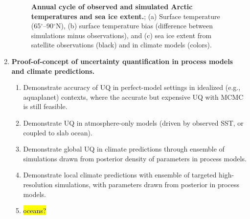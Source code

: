 \documentclass{article}
\begin{document}
\begin{enumerate}
\begin{figure}[htb]
       \caption{\textbf{Annual cycle of observed and simulated Arctic temperatures and sea ice extent.}; (a) Surface temperature (65$^\circ$--90$^\circ$N), (b) surface temperature bias (difference between simulations minus observations), and (c) sea ice extent from satellite observations (black) and in climate models (colors).}\label{f:polar-bias}
    \end{figure}

    
    \item \textbf{Proof-of-concept of uncertainty quantification in process models and climate predictions.}
    \begin{enumerate}
        \item Demonstrate accuracy of UQ in perfect-model settings in idealized (e.g., aquaplanet) contexts, where the accurate but expensive UQ with MCMC is still feasible. 
        \item Demonstrate UQ in atmosphere-only models (driven by observed SST, or coupled to slab ocean).
        \item Demonstrate global UQ in climate predictions through ensemble of simulations drawn from posterior density of parameters in process models.
        \item Demonstrate local climate predictions with ensemble of targeted high-resolution simulations, with parameters drawn from posterior in process models.
        \item \hl{oceans?}
    \end{enumerate}
\end{enumerate}

\clearpage


\end{document}
